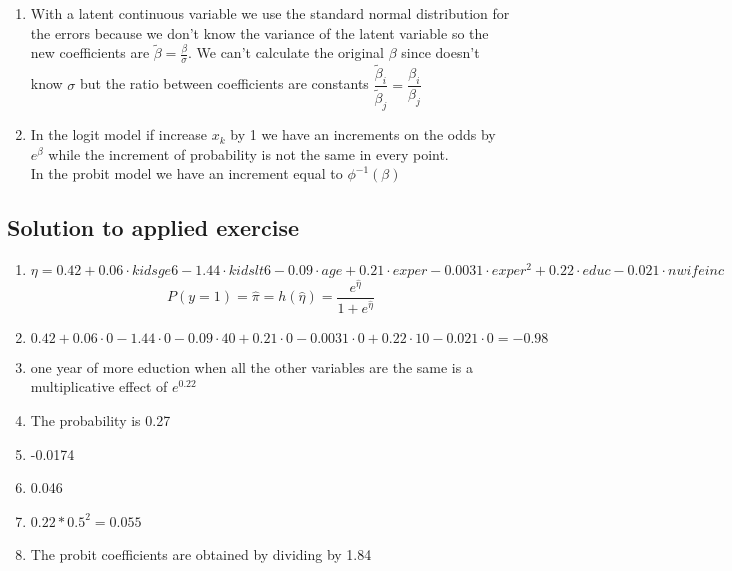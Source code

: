 \documentclass[10pt,a4paper]{article}
\begin{document}
\begin{enumerate}
		\item With a latent continuous variable we use the standard normal distribution for the errors because we don't know the variance of the latent variable so the new coefficients are $ \tilde{\beta} = \frac{\beta}{\sigma} $. We can't calculate the original $ \beta $ since doesn't know $ \sigma $ but the ratio between coefficients are constants $ \dfrac{\tilde{\beta}_i}{\tilde{\beta}_j} = \dfrac{\beta_i}{\beta_j}$ 
		\item In the logit model if increase $ x_k $ by 1 we have an increments on the odds by $ e^\beta $ while the increment of probability is not the same in every point. \\ In the probit model we have an increment equal to $ \phi^{-1}(\beta) $
		\end{enumerate}
		\subsection*{Solution to applied exercise}
		\begin{enumerate}
			\item 		$$ \eta = 0.42 + 0.06 \cdot kidsge6 - 1.44 \cdot kidslt6 - 0.09 \cdot age + 0.21 \cdot exper - 0.0031 \cdot exper^2 + 0.22 \cdot educ - 0.021 \cdot nwifeinc$$
			$$
			P(y = 1) =
			\hat{\pi} = h(\hat{\eta}) =   \dfrac{e^{\hat{\eta}}}{1 + e^{\hat{\eta}}} $$
			\item $$ 0.42 + 0.06 \cdot 0 - 1.44 \cdot 0 - 0.09 \cdot 40 + 0.21 \cdot 0 - 0.0031 \cdot 0 + 0.22 \cdot 10 - 0.021 \cdot 0 = -0.98$$
			\item one year of more eduction when all the other variables are the same is a multiplicative effect of $ e^{0.22} $
			\item The probability is 0.27
			\item -0.0174
			\item 0.046
			\item $ 0.22 * 0.5^2 =  0.055 $
			\item The probit coefficients are obtained by dividing by 1.84
		\end{enumerate}
\end{document}
